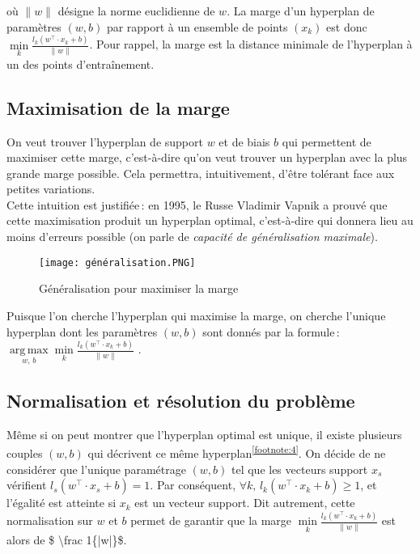 \documentclass{article}
\begin{document}
où $\|w\|$ désigne la norme euclidienne de $w$. La marge d’un hyperplan de paramètres $(w,b)$ par rapport à un ensemble de points $(x_k)$ est donc $\min\limits_k  \frac{l_k (w^\top \cdot x_k+b)}{\|w\|}$. Pour rappel, la marge est la distance minimale de l’hyperplan à un des points d’entraînement.
\vspace{5mm} %
\subsection{Maximisation de la marge}
\vspace{5mm} %
On veut trouver l’hyperplan de support $w$ et de biais $b$ qui permettent de maximiser cette marge, c’est-à-dire qu’on veut trouver un hyperplan avec la plus grande marge possible. Cela permettra, intuitivement, d’être tolérant face aux petites variations. \\
Cette intuition est justifiée : en 1995, le Russe Vladimir Vapnik a prouvé que cette maximisation produit un hyperplan optimal, c’est-à-dire qui donnera lieu au moins d’erreurs possible (on parle de \textit{capacité de généralisation maximale}).
\vspace{5mm} %
\begin{figure}[b!]
    \centering
    \texttt{[image: généralisation.PNG]}
    \caption{Généralisation pour maximiser la marge}
    \label{fig7:my_label}
\end{figure}
 
\vspace{5mm} %
Puisque l’on cherche l’hyperplan qui maximise la marge, on cherche l’unique hyperplan dont les paramètres $(w, b)$ sont donnés par la formule : $\displaystyle \mathop{\operatorname{arg\,max}}\limits_{w,\,b}\min\limits_k \frac{l_k (w^\top \cdot x_k+b)}{\|w\|}$ .
\vspace{5mm} %
\subsection{Normalisation et résolution du problème}
\vspace{5mm} %
Même si on peut montrer que l’hyperplan optimal est unique, il existe plusieurs couples $(w, b)$ qui décrivent ce même hyperplan\textsuperscript{\ref{footnote:4}}. On décide de ne considérer que l’unique paramétrage $(w, b)$ tel que les vecteurs support $x_s$ vérifient $l_s (w^\top \cdot x_s + b) = 1$. Par conséquent, $\forall k, \, l_k (w^\top \cdot x_k+b)\geq1$, et l’égalité est atteinte si $x_k$ est un vecteur support. Dit autrement, cette normalisation sur $w$ et $b$ permet de garantir que la marge $\min\limits_k \frac{l_k (w^\top \cdot x_k+b)}{\|w\|}$ est alors de \$ \textbackslash{}frac 1\{|w|\}\$.
\end{document}

